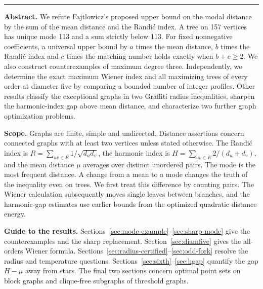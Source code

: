\documentclass[11pt,a4paper]{article}
\begin{document}
\thispagestyle{plain}
\par
\vspace{9pt}\par
\vspace{5pt}\par
\vspace{8pt}\par
\vspace{9pt}\hrule\vspace{9pt}
\noindent\textbf{Abstract.}
We refute Fajtlowicz's proposed upper bound on the modal distance by the sum of the mean distance and the Randi\'c index. A tree on 157 vertices has unique mode 113 and a sum strictly below 113. For fixed nonnegative coefficients, a universal upper bound by $a$ times the mean distance, $b$ times the Randi\'c index and $c$ times the matching number holds exactly when $b+c\ge2$. We also construct counterexamples of maximum degree three. Independently, we determine the exact maximum Wiener index and all maximizing trees of every order at diameter five by comparing a bounded number of integer profiles. Other results classify the exceptional graphs in two Graffiti radius inequalities, sharpen the harmonic-index gap above mean distance, and characterize two further graph optimization problems.

\medskip\noindent\textbf{Scope.}
Graphs are finite, simple and undirected. Distance assertions concern connected graphs with at least two vertices unless stated otherwise. The Randi\'c index is $R=\sum_{uv\in E}1/\sqrt{d_ud_v}$, the harmonic index is $H=\sum_{uv\in E}2/(d_u+d_v)$, and the mean distance $\mu$ averages over distinct unordered pairs. The mode is the most frequent distance. A change from a mean to a mode changes the truth of the inequality even on trees. We first treat this difference by counting pairs. The Wiener calculation subsequently moves single leaves between branches, and the harmonic-gap estimates use earlier bounds from the optimized quadratic distance energy.

\medskip\noindent\textbf{Guide to the results.}
Sections~\ref{sec:mode-example}--\ref{sec:sharp-mode} give the counterexamples and the sharp replacement.
Section~\ref{sec:diamfive} gives the all-orders Wiener formula.
Sections~\ref{sec:radius-certified}--\ref{sec:odd-fork} resolve the radius and temperature questions.
Sections~\ref{sec:sixth}--\ref{sec:hgap} quantify the gap $H-\mu$ away from stars.
The final two sections concern optimal point sets on block graphs and clique-free subgraphs of threshold graphs.
\end{document}
